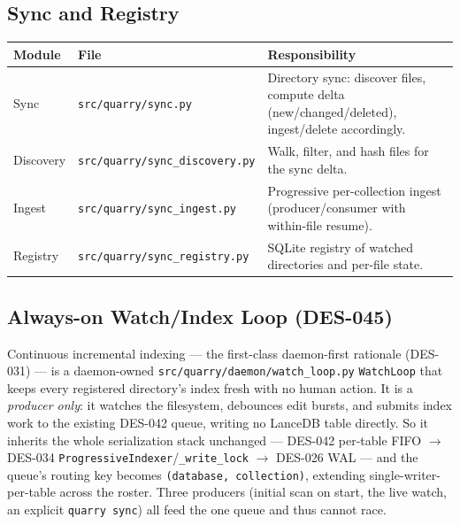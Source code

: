 \documentclass[a4paper,10pt]{article}
\newcommand{\modpath}[1]{\texttt{src/quarry/#1}}
\begin{document}
\subsection{Sync and Registry}

\begin{center}
\begin{tabular}{llp{7cm}}
\toprule
\textbf{Module} & \textbf{File} & \textbf{Responsibility} \\
\midrule
Sync       & \modpath{sync.py}           & Directory sync: discover
             files, compute delta (new/changed/deleted),
             ingest/delete accordingly. \\
Discovery  & \modpath{sync\_discovery.py} & Walk, filter, and hash files
             for the sync delta. \\
Ingest     & \modpath{sync\_ingest.py}    & Progressive per-collection
             ingest (producer/consumer with within-file resume). \\
Registry   & \modpath{sync\_registry.py}  & SQLite registry of watched
             directories and per-file state. \\
\bottomrule
\end{tabular}
\end{center}

\subsection{Always-on Watch/Index Loop (DES-045)}

Continuous incremental indexing --- the first-class daemon-first rationale
(DES-031) --- is a daemon-owned \modpath{daemon/watch\_loop.py}
\texttt{WatchLoop} that keeps every registered directory's index fresh with no
human action. It is a \emph{producer only}: it watches the filesystem,
debounces edit bursts, and submits index work to the existing DES-042 queue,
writing no LanceDB table directly. So it inherits the whole serialization
stack unchanged --- DES-042 per-table FIFO $\to$ DES-034
\texttt{ProgressiveIndexer}/\texttt{\_write\_lock} $\to$ DES-026 WAL --- and the
queue's routing key becomes \texttt{(database, collection)}, extending
single-writer-per-table across the roster. Three producers (initial scan on
start, the live watch, an explicit \texttt{quarry sync}) all feed the one queue
and thus cannot race.
\end{document}
